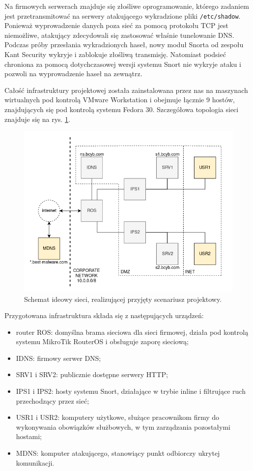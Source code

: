 \documentclass{eiti-raport}
\begin{document}
Na firmowych serwerach znajduje się złośliwe oprogramowanie, którego zadaniem jest przetransmitować na serwery atakującego wykradzione pliki \texttt{/etc/shadow}. Ponieważ wyprowadzenie danych poza sieć za pomocą protokołu TCP jest niemożliwe, atakujący zdecydowali się zastosować właśnie tunelowanie DNS. Podczas próby przesłania wykradzionych haseł, nowy moduł Snorta od zespołu Kant Security wykryje i zablokuje złośliwą transmisję. Natomiast podsieć chroniona za pomocą dotychczasowej wersji systemu Snort nie wykryje ataku i pozwoli na wyprowadzenie haseł na zewnątrz. 

Całość infrastruktury projektowej została zainstalowana przez nas na maszynach wirtualnych pod kontrolą VMware Workstation i obejmuje łącznie 9 hostów, znajdujących się pod kontrolą systemu Fedora 30. Szczegółowa topologia sieci znajduje się na rys. \ref{fig:topologia}. 
\begin{figure}[!h] \centering
	\includegraphics[width=0.9\linewidth]{img/BCYB_topologia.png}
	\caption{Schemat ideowy sieci, realizującej przyjęty scenariusz projektowy.} \label{fig:topologia}
\end{figure}
Przygotowana infrastruktura składa się z następujących urządzeń: 
\begin{itemize}
	\item router ROS: domyślna brama sieciowa dla sieci firmowej, działa pod kontrolą systemu MikroTik RouterOS i obsługuje zaporę sieciową;
	\item IDNS: firmowy serwer DNS;
	\item SRV1 i SRV2: publicznie dostępne serwery HTTP;
	\item IPS1 i IPS2: hosty systemu Snort, działające w trybie inline i filtrujące ruch przechodzący przez sieć;
	\item USR1 i USR2: komputery użytkowe, służące pracownikom firmy do wykonywania obowiązków służbowych, w tym zarządzania pozostałymi hostami;
	\item MDNS: komputer atakującego, stanowiący punkt odbiorczy ukrytej komunikacji. 
\end{itemize}
\end{document}
